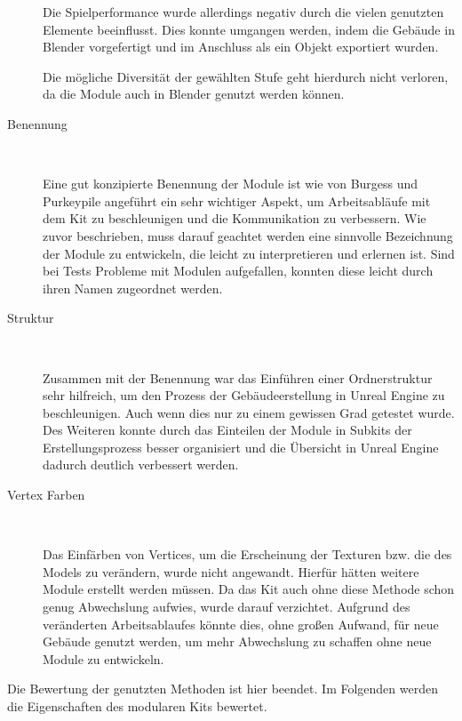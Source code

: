 \begin{description}
\par
Die Spielperformance wurde allerdings negativ durch die vielen genutzten Elemente beeinflusst. Dies konnte umgangen werden, indem die Gebäude in Blender vorgefertigt und im Anschluss als ein Objekt exportiert wurden.
\par
Die mögliche Diversität der gewählten Stufe geht hierdurch nicht verloren, da die Module auch in Blender genutzt werden können.
\item[Benennung]~\par
Eine gut konzipierte Benennung der Module ist wie von Burgess und Purkeypile angeführt ein sehr wichtiger Aspekt, um Arbeitsabläufe mit dem Kit zu beschleunigen und die Kommunikation zu verbessern. Wie zuvor beschrieben, muss darauf geachtet werden eine sinnvolle Bezeichnung der Module zu entwickeln, die leicht zu interpretieren und erlernen ist. Sind bei Tests Probleme mit Modulen aufgefallen, konnten diese leicht durch ihren Namen zugeordnet werden.
\item[Struktur]~\par
Zusammen mit der Benennung war das Einführen einer Ordnerstruktur sehr hilfreich, um den Prozess der Gebäudeerstellung in Unreal Engine zu beschleunigen. Auch wenn dies nur zu einem gewissen Grad getestet wurde. Des Weiteren konnte durch das Einteilen der Module in Subkits der Erstellungsprozess besser organisiert und die Übersicht in Unreal Engine dadurch deutlich verbessert werden.
\item[Vertex Farben]~\par
Das Einfärben von Vertices, um die Erscheinung der Texturen bzw. die des Models zu verändern, wurde nicht angewandt. Hierfür hätten weitere Module erstellt werden müssen. Da das Kit auch ohne diese Methode schon genug Abwechslung aufwies, wurde darauf verzichtet. Aufgrund des veränderten Arbeitsablaufes könnte dies, ohne großen Aufwand, für neue Gebäude genutzt werden, um mehr Abwechslung zu schaffen ohne neue Module zu entwickeln.
\end{description}
Die Bewertung der genutzten Methoden ist hier beendet. Im Folgenden werden die Eigenschaften des modularen Kits bewertet.
